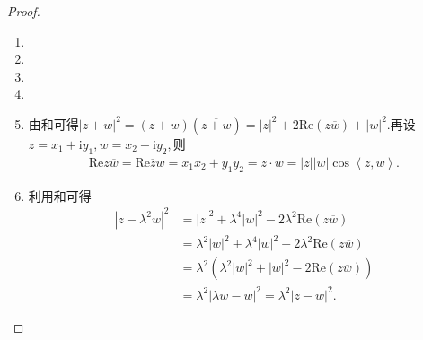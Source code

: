 \documentclass[../../main.tex]{subfiles}%
\begin{document}
\begin{proof}
\begin{enumerate}[(1)]
\item 

\item 

\item

\item

\item 由和可得$|z + w|^2 = (z + w)(\overline{z + w}) = |z|^2 + 2\mathrm{Re}(z\overline{w}) + |w|^2.$再设$z=x_1+\mathrm{i}y_1,w=x_2+\mathrm{i}y_2,$则
\begin{align*}
\mathrm{Re}z\overline{w}=\mathrm{Re}\overline{z}w=x_1x_2+y_1y_2=z\cdot w=\left| z \right|\left| w \right|\cos \left< z,w \right>.
\end{align*}

\item 利用和可得
\begin{align*}
\left| z-\lambda ^2w \right|^2&=\left| z \right|^2+\lambda ^4\left| w \right|^2-2\lambda ^2\mathrm{Re}\left( z\overline{w} \right) 
\\
&=\lambda ^2\left| w \right|^2+\lambda ^4\left| w \right|^2-2\lambda ^2\mathrm{Re}\left( z\overline{w} \right) 
\\
&=\lambda ^2\left( \lambda ^2\left| w \right|^2+\left| w \right|^2-2\mathrm{Re}\left( z\overline{w} \right) \right) 
\\
&=\lambda ^2\left| \lambda w-w \right|^2=\lambda ^2\left| z-w \right|^2.
\end{align*}
\end{enumerate}

\end{proof}
\end{document}
